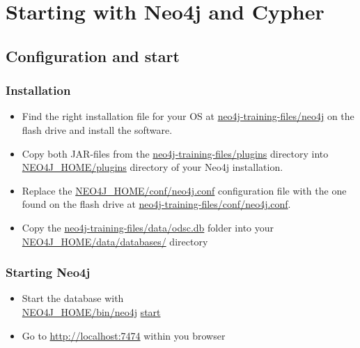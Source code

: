 \documentclass[12pt]{beamer}
\begin{document}
    \section{Starting with Neo4j and Cypher}
    \subsection{Configuration and start}
    \begin{frame}
        \frametitle{Installation}
        \begin{itemize}
            \item Find the right installation file for your OS at \textcolor{white}{\url{neo4j-training-files/neo4j}} on the flash drive and install the software.
            \pause
            \item Copy both JAR-files from the \textcolor{white}{\url{neo4j-training-files/plugins}} directory into \textcolor{white}{\url{NEO4J_HOME/plugins}} directory of your Neo4j installation.
            \pause
            \item Replace the \textcolor{white}{\url{NEO4J_HOME/conf/neo4j.conf}} configuration file with the one found on the flash drive at \textcolor{white}{\url{neo4j-training-files/conf/neo4j.conf}}.
            \pause
            \item Copy the \textcolor{white}{\url{neo4j-training-files/data/odsc.db}} folder into your \textcolor{white}{\url{NEO4J_HOME/data/databases/}} directory
        \end{itemize}
    \end{frame}
    
    \begin{frame}
        \frametitle{Starting Neo4j}
        \begin{itemize}
            \item Start the database with\\
            \textcolor{white}{\url{NEO4J_HOME/bin/neo4j} \url{start}}
            \pause
            \item Go to \textcolor{white}{\url{http://localhost:7474}} within you browser
        \end{itemize}
    \end{frame}
    
\end{document}
